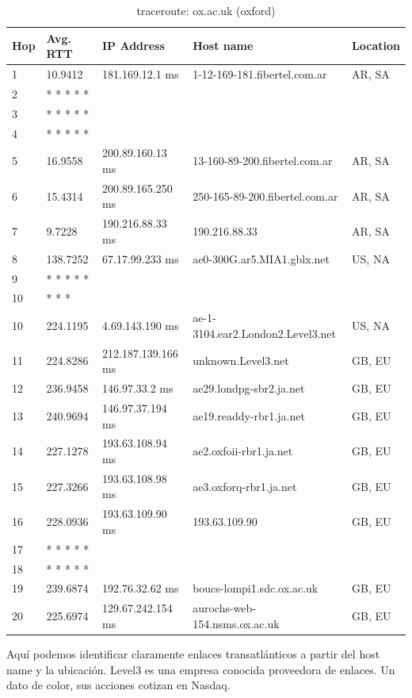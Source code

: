 \begin{table}[H]
\caption{traceroute: ox.ac.uk (oxford)}
\centering
\begin{tabular}{@{}lllll@{}}
\toprule
Hop & Avg. RTT & IP Address & Host name & Location\\ \midrule
1 & 10.9412 & 181.169.12.1 ms & 1-12-169-181.fibertel.com.ar & AR, SA\\
2 &  * * * * * &  &  &  \\
3 &  * * * * * &  &  &  \\
4 &  * * * * * &  &  &  \\
5 & 16.9558 & 200.89.160.13 ms & 13-160-89-200.fibertel.com.ar & AR, SA\\
6 & 15.4314 & 200.89.165.250 ms & 250-165-89-200.fibertel.com.ar & AR, SA\\
7 & 9.7228 & 190.216.88.33 ms & 190.216.88.33 & AR, SA\\
8 & 138.7252 & 67.17.99.233 ms & ae0-300G.ar5.MIA1.gblx.net & US, NA\\
9 &  * * * * * &  &  &  \\
10 &  * * * &  &  &  \\
10 & 224.1195 & 4.69.143.190 ms & ae-1-3104.ear2.London2.Level3.net & US, NA\\
11 & 224.8286 & 212.187.139.166 ms & unknown.Level3.net & GB, EU\\
12 & 236.9458 & 146.97.33.2 ms & ae29.londpg-sbr2.ja.net & GB, EU\\
13 & 240.9694 & 146.97.37.194 ms & ae19.readdy-rbr1.ja.net & GB, EU\\
14 & 227.1278 & 193.63.108.94 ms & ae2.oxfoii-rbr1.ja.net & GB, EU\\
15 & 227.3266 & 193.63.108.98 ms & ae3.oxforq-rbr1.ja.net & GB, EU\\
16 & 228.0936 & 193.63.109.90 ms & 193.63.109.90 & GB, EU\\
17 &  * * * * * &  &  &  \\
18 &  * * * * * &  &  &  \\
19 & 239.6874 & 192.76.32.62 ms & boucs-lompi1.sdc.ox.ac.uk & GB, EU\\
20 & 225.6974 & 129.67.242.154 ms & aurochs-web-154.nsms.ox.ac.uk & GB, EU\\ \bottomrule
\end{tabular}
\label{oxford}
\end{table}

Aquí podemos identificar claramente enlaces transatlánticos a partir del host name y la ubicación. Level3 es una empresa conocida proveedora de enlaces. Un dato de color, sus acciones cotizan en Nasdaq.

